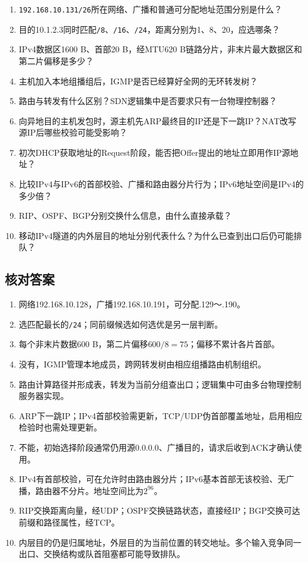 \begin{enumerate}
\def\labelenumi{\arabic{enumi}.}
\tightlist
\item
  \texttt{192.168.10.131/\allowbreak{}26}所在网络、广播和普通可分配地址范围分别是什么？
\item
  目的10.1.2.3同时匹配\texttt{/\allowbreak{}8}、\texttt{/\allowbreak{}16}、\texttt{/\allowbreak{}24}，距离分别为1、8、20，应选哪条？
\item
  IPv4数据区1600 B、首部20 B，经MTU620 B链路分片，非末片最大数据区和第二片偏移是多少？
\item
  主机加入本地组播组后，IGMP是否已经算好全网的无环转发树？
\item
  路由与转发有什么区别？SDN逻辑集中是否要求只有一台物理控制器？
\item
  向异地目的主机发包时，源主机先ARP最终目的IP还是下一跳IP？NAT改写源IP后哪些校验可能受影响？
\item
  初次DHCP获取地址的Request阶段，能否把Offer提出的地址立即用作IP源地址？
\item
  比较IPv4与IPv6的首部校验、广播和路由器分片行为；IPv6地址空间是IPv4的多少倍？
\item
  RIP、OSPF、BGP分别交换什么信息，由什么直接承载？
\item
  移动IPv4隧道的内外层目的地址分别代表什么？为什么已查到出口后仍可能排队？
\end{enumerate}

\subsection{核对答案}\label{CN04-review-answers}

\begin{enumerate}
\def\labelenumi{\arabic{enumi}.}
\tightlist
\item
  网络192.168.10.128，广播192.168.10.191，可分配.129～.190。
\item
  选匹配最长的\texttt{/\allowbreak{}24}；同前缀候选如何选优是另一层判断。
\item
  每个非末片数据600 B，第二片偏移\(600/8=75\)；偏移不累计各片首部。
\item
  没有，IGMP管理本地成员，跨网转发树由相应组播路由机制组织。
\item
  路由计算路径并形成表，转发为当前分组查出口；逻辑集中可由多台物理控制服务器实现。
\item
  ARP下一跳IP；IPv4首部校验需更新，TCP/UDP伪首部覆盖地址，启用相应检验时也需处理更新。
\item
  不能，初始选择阶段通常仍用源0.0.0.0、广播目的，请求后收到ACK才确认使用。
\item
  IPv4有首部校验，可在允许时由路由器分片；IPv6基本首部无该校验、无广播，路由器不分片。地址空间比为\(2^{96}\)。
\item
  RIP交换距离向量，经UDP；OSPF交换链路状态，直接经IP；BGP交换可达前缀和路径属性，经TCP。
\item
  内层目的仍是归属地址，外层目的为当前位置的转交地址。多个输入竞争同一出口、交换结构或队首阻塞都可能导致排队。
\end{enumerate}
